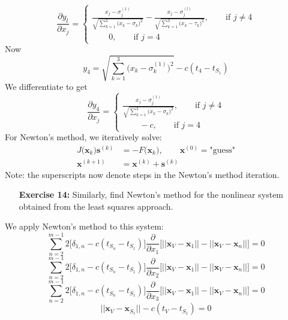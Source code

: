 \documentclass[11pt]{article}
\theoremstyle{definition}
\newcommand{\1}[1]{\mathbf{1} \left \{ #1 \right \}}
\begin{document}
\begin{equation}
    \frac{\partial y_l}{\partial x_j} = \begin{cases}
    \frac{x_j - \sigma_j^{(1)}}{\sqrt{\sum_{k=1}^3 \big(x_k - \sigma_k\big)^2}} - \frac{x_j - \sigma_j^{(l)}}{\sqrt{\sum_{k=1}^3 \big(x_k - \tau_k\big)^2}}, \qquad \text{if } j \neq 4 \\
    \qquad 0, \qquad \text{if } j = 4
    \end{cases}
\end{equation}
Now
\begin{equation}
    y_4 = \sqrt{\sum_{k=1}^3 \big(x_k - \sigma_k^{(1)}\big)^2} -  c(t_4 - t_{S_1})
\end{equation}
We differentiate to get
\begin{equation}
    \frac{\partial y_4}{\partial x_j} = \begin{cases}
    \frac{x_j - \sigma_j^{(1)}}{\sqrt{\sum_{k=1}^3 \big(x_k - \sigma_k\big)^2}}, \qquad \text{if } j \neq 4 \\
    \qquad -c, \qquad \text{if } j = 4
    \end{cases}
\end{equation}
For Newton's method, we iteratively solve:
\begin{align*}
    J\big(\textbf{x}_k\big)\textbf{s}^{(k)} &= -F\big(\textbf{x}_k\big), \qquad \textbf{x}^{(0)} = \text{"guess"} \\
    \textbf{x}^{(k+1)} &= \textbf{x}^{(k)} + \textbf{s}^{(k)}
\end{align*}
Note: the superscripts now denote steps in the Newton's method iteration.

\begin{itemize}
\item[{\textbf{Exercise 14:}}] Similarly, find Newton's method for the nonlinear system obtained from the least squares approach.
\end{itemize}
We apply Newton's method to this system:
\begin{equation*}
    \sum_{n=2}^{m-1} 2\big[\delta_{1,n} - c(t_{S_n} - t_{S_1})\big] \frac{\partial}{\partial x_1} \big[||\textbf{x}_V - \textbf{x}_1|| - ||\textbf{x}_V - \textbf{x}_n||\big] = 0
\end{equation*}
\begin{equation*}
    \sum_{n=2}^{m-1} 2\big[\delta_{1,n} - c(t_{S_n} - t_{S_1})\big] \frac{\partial}{\partial x_2} \big[||\textbf{x}_V - \textbf{x}_1|| - ||\textbf{x}_V - \textbf{x}_n||\big] = 0
\end{equation*}
\begin{equation*}
    \sum_{n=2}^{m-1} 2\big[\delta_{1,n} - c(t_{S_n} - t_{S_1})\big] \frac{\partial}{\partial x_3} \big[||\textbf{x}_V - \textbf{x}_1|| - ||\textbf{x}_V - \textbf{x}_n||\big] = 0
\end{equation*}
\begin{equation*}
    ||\textbf{x}_V - \textbf{x}_{S_1}|| - c(t_V - t_{S_1}) = 0
\end{equation*}
\end{document}
